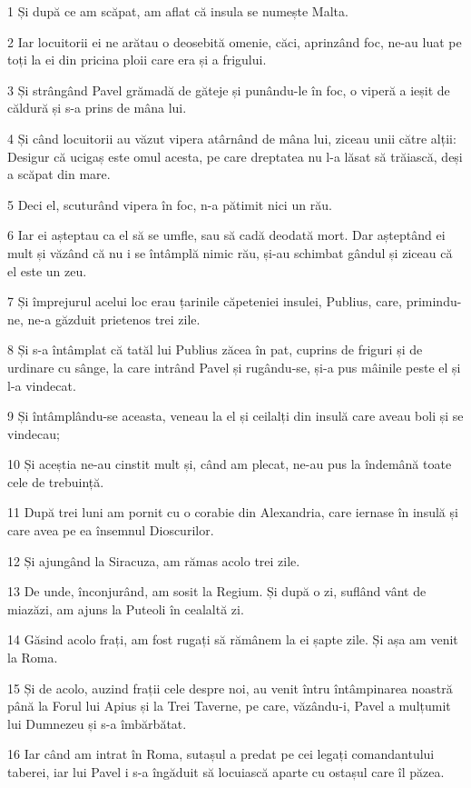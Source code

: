 \par 1 Și după ce am scăpat, am aflat că insula se numește Malta.
\par 2 Iar locuitorii ei ne arătau o deosebită omenie, căci, aprinzând foc, ne-au luat pe toți la ei din pricina ploii care era și a frigului.
\par 3 Și strângând Pavel grămadă de găteje și punându-le în foc, o viperă a ieșit de căldură și s-a prins de mâna lui.
\par 4 Și când locuitorii au văzut vipera atârnând de mâna lui, ziceau unii către alții: Desigur că ucigaș este omul acesta, pe care dreptatea nu l-a lăsat să trăiască, deși a scăpat din mare.
\par 5 Deci el, scuturând vipera în foc, n-a pătimit nici un rău.
\par 6 Iar ei așteptau ca el să se umfle, sau să cadă deodată mort. Dar așteptând ei mult și văzând că nu i se întâmplă nimic rău, și-au schimbat gândul și ziceau că el este un zeu.
\par 7 Și împrejurul acelui loc erau țarinile căpeteniei insulei, Publius, care, primindu-ne, ne-a găzduit prietenos trei zile.
\par 8 Și s-a întâmplat că tatăl lui Publius zăcea în pat, cuprins de friguri și de urdinare cu sânge, la care intrând Pavel și rugându-se, și-a pus mâinile peste el și l-a vindecat.
\par 9 Și întâmplându-se aceasta, veneau la el și ceilalți din insulă care aveau boli și se vindecau;
\par 10 Și aceștia ne-au cinstit mult și, când am plecat, ne-au pus la îndemână toate cele de trebuință.
\par 11 După trei luni am pornit cu o corabie din Alexandria, care iernase în insulă și care avea pe ea însemnul Dioscurilor.
\par 12 Și ajungând la Siracuza, am rămas acolo trei zile.
\par 13 De unde, înconjurând, am sosit la Regium. Și după o zi, suflând vânt de miazăzi, am ajuns la Puteoli în cealaltă zi.
\par 14 Găsind acolo frați, am fost rugați să rămânem la ei șapte zile. Și așa am venit la Roma.
\par 15 Și de acolo, auzind frații cele despre noi, au venit întru întâmpinarea noastră până la Forul lui Apius și la Trei Taverne, pe care, văzându-i, Pavel a mulțumit lui Dumnezeu și s-a îmbărbătat.
\par 16 Iar când am intrat în Roma, sutașul a predat pe cei legați comandantului taberei, iar lui Pavel i s-a îngăduit să locuiască aparte cu ostașul care îl păzea.
